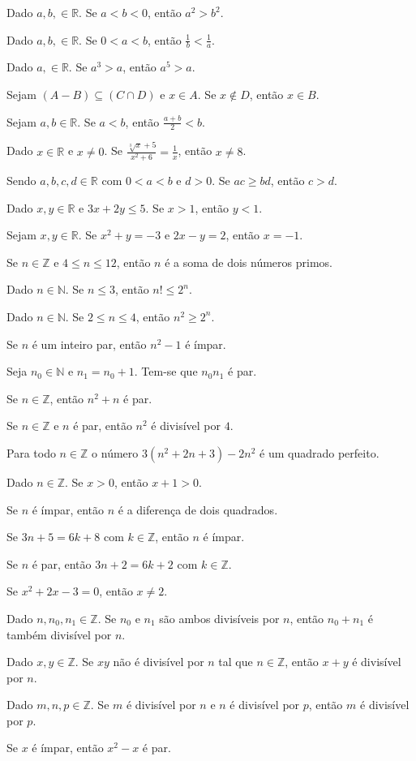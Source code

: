 \begin{exerList}
	\item Dado $a, b, \in \mathbb{R}$. Se $a < b < 0$, então $a^2 > b^2$.
	\item Dado $a, b, \in \mathbb{R}$. Se $0 < a < b$, então $\frac{1}{b} < \frac{1}{a}$.
	\item Dado $a, \in \mathbb{R}$. Se $a^3 > a$, então $a^5 > a$.
	\item Sejam $(A - B) \subseteq (C \cap D)$ e $x \in A$. Se $x \notin D$, então $x \in B$.
	\item Sejam $a, b \in \mathbb{R}$. Se $a < b$, então $\frac{a + b}{2} < b$.
	\item Dado $x \in \mathbb{R}$ e $x \neq 0$. Se $\frac{\sqrt[3]{x} + 5}{x^2 + 6} = \frac{1}{x}$, então $x \neq 8$.
	\item Sendo $a, b, c, d \in \mathbb{R}$ com $0 < a < b$ e $d > 0$. Se $ac \geq bd$, então $c > d$.
	\item Dado $x, y \in \mathbb{R}$ e $3x + 2y \leq 5$. Se $x > 1$, então $y < 1$.
	\item Sejam $x, y \in \mathbb{R}$. Se $x^2 + y = -3$ e $2x - y = 2$, então $x = -1$.
	\item Se $n \in \mathbb{Z}$ e $4 \leq n \leq 12$, então $n$ é a soma de dois números primos.
	\item Dado $n \in \mathbb{N}$. Se $n \leq 3$, então $n! \leq 2^n$.
	\item Dado $n \in \mathbb{N}$. Se $2 \leq n \leq 4$, então $n^2 \geq 2^n$. 
	\item Se $n$ é um inteiro par, então $n^2 - 1$ é ímpar.
	\item Seja $n_0 \in \mathbb{N}$ e $n_1 = n_0 + 1$. Tem-se que $n_0n_1$ é par.
	\item Se $n \in \mathbb{Z}$, então $n^2 + n$ é par.
	\item Se $n \in \mathbb{Z}$ e $n$ é par, então $n^2$ é divisível por $4$. 
	\item Para todo $n \in \mathbb{Z}$ o número $3(n^2 + 2n + 3) - 2n^2$ é um quadrado perfeito.
	\item Dado $n \in \mathbb{Z}$. Se $x > 0$, então $x + 1 > 0$.
	\item Se $n$ é ímpar, então $n$ é a diferença de dois quadrados.
	\item Se $3n + 5 = 6k + 8$ com $k \in \mathbb{Z}$, então $n$ é ímpar.
	\item Se $n$ é par, então $3n + 2 = 6k + 2$ com $k \in \mathbb{Z}$.
	\item Se $x^2 + 2x - 3 = 0$, então $x \neq 2$.
	\item Dado $n, n_0, n_1 \in \mathbb{Z}$. Se $n_0$ e $n_1$ são ambos divisíveis por $n$, então $n_0 + n_1$ é também divisível por $n$.
	\item Dado $x, y \in \mathbb{Z}$. Se $xy$ não é divisível por $n$ tal que $n \in \mathbb{Z}$, então $x + y$ é divisível por $n$.
	\item Dado $m, n, p \in \mathbb{Z}$. Se $m$ é divisível por $n$ e $n$ é divisível por $p$, então $m$ é divisível por $p$.
	\item Se $x$ é ímpar, então $x^2 - x$ é par.
\end{exerList}

